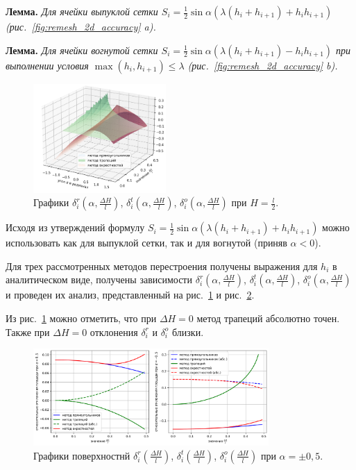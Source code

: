 \documentclass[a4paper,14pt]{extarticle}                     %
\theoremstyle{plain}                                         %
\begin{document}
\textbf{Лемма.} \textit{Для ячейки выпуклой сетки $S_i = \frac{1}{2} \sin \alpha \left( \lambda(h_i + h_{i+1}) + h_ih_{i+1} \right)$ (рис.~\ref{fig:remesh_2d_accuracy} a).}

\textbf{Лемма.} \textit{Для ячейки вогнутой сетки $S_i = \frac{1}{2} \sin \alpha \left( \lambda(h_i + h_{i+1}) - h_ih_{i+1} \right)$ при выполнении условия $\max(h_i, h_{i+1}) \le \lambda$ (рис.~\ref{fig:remesh_2d_accuracy} b).}

\begin{figure}[ht]
\centering
\includegraphics[width=0.45\textwidth]{pics/text_1_remesh_2d/remesh_3d_chart.png}
\singlespacing
\caption{Графики $\delta_i^r(\alpha, \frac{\Delta H}{l})$, $\delta_i^t(\alpha, \frac{\Delta H}{l})$, $\delta_i^o(\alpha, \frac{\Delta H}{l})$ при $H = \frac{l}{2}$.}
\label{fig:text_1_remesh_3d_main_chart}
\end{figure}

Исходя из утверждений формулу $S_i = \frac{1}{2} \sin \alpha \left( \lambda(h_i + h_{i+1}) + h_ih_{i+1} \right)$ можно использовать как для выпуклой сетки, так и для вогнутой (приняв $\alpha < 0$).

Для трех рассмотренных методов перестроения получены выражения для $h_i$ в аналитическом виде, получены зависимости $\delta_i^r(\alpha, \frac{\Delta H}{l})$, $\delta_i^t(\alpha, \frac{\Delta H}{l})$, $\delta_i^o(\alpha, \frac{\Delta H}{l})$ и проведен их анализ, представленный на рис.~\ref{fig:text_1_remesh_3d_main_chart} и рис.~\ref{fig:text_1_remesh_fix_alfa_chart}.

Из рис.~\ref{fig:text_1_remesh_3d_main_chart} можно отметить, что при $\Delta H = 0$ метод трапеций абсолютно точен.
Также при $\Delta H = 0$ отклонения $\delta_i^r$ и $\delta_i^o$ близки.

\begin{figure}[ht]
\centering
\includegraphics[width=0.8\textwidth]{pics/text_1_remesh_2d/remesh_fix_alfa_chart.png}
\singlespacing
\caption{Графики поверхностнй $\delta_i^r(\frac{\Delta H}{l})$, $\delta_i^t(\frac{\Delta H}{l})$, $\delta_i^o(\frac{\Delta H}{l})$ при $\alpha = \pm 0,5$.}
\label{fig:text_1_remesh_fix_alfa_chart}
\end{figure}
\end{document}
